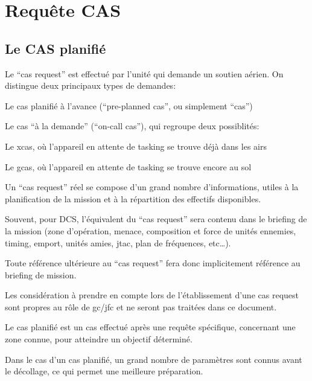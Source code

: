 \section{Requête CAS}
\label{casrequestsection}



\subsection{Le CAS planifié}

\e
    \item Le ``\gls{cas} request'' est effectué par l'unité qui demande un soutien aérien. On distingue deux principaux types de demandes:
    \ee
        \item Le \gls{cas} planifié à l'avance (``pre-planned \gls{cas}'', ou simplement ``\gls{cas}'')
        \item Le \gls{cas} ``à la demande'' (``on-call cas''), qui regroupe deux possiblités:
        \eee
            \item Le \gls{xcas}, où l'appareil en attente de tasking se trouve déjà dans les airs
            \item Le \gls{gcas}, où l'appareil en attente de tasking se trouve encore au sol
        \ed
    \ed
    \item Un ``\gls{cas} request'' réel se compose d'un grand nombre d'informations, utiles à la planification de la mission et à la répartition des effectifs disponibles.
    \item
    Souvent, pour DCS, l'équivalent du ``\gls{cas} request'' sera contenu dans le briefing de la mission (zone d'opération, menace, composition et force de unités ennemies, timing, emport, unités amies, \gls{jtac}, plan de fréquences, etc…).
    \item Toute référence ultérieure au ``\gls{cas} request'' fera donc implicitement référence au briefing de mission.
    \item Les considération à prendre en compte lors de l'établissement d'une \gls{cas} request sont propres au rôle de \gls{gc}/\gls{jfc} et ne seront pas traitées dans ce document.
    \item Le \gls{cas} planifié est un \gls{cas} effectué après une requête spécifique, concernant une zone connue, pour atteindre un objectif déterminé.
    \item Dans le cas d'un \gls{cas} planifié, un grand nombre de paramètres sont connus avant le décollage, ce qui permet une meilleure préparation.
\ed

